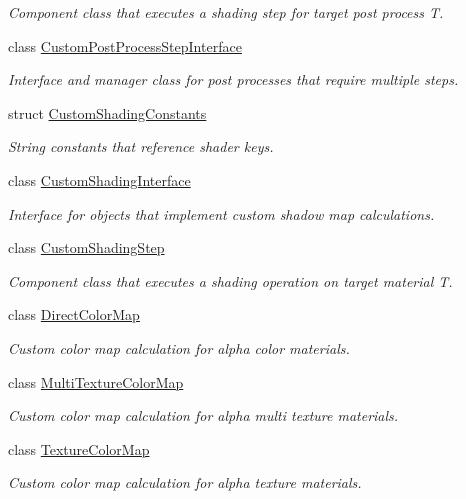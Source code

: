 \begin{DoxyCompactItemize}
\begin{DoxyCompactList}\small\item\em Component class that executes a shading step for target post process T. \end{DoxyCompactList}\item 
class \mbox{\hyperlink{class_geometry_engine_1_1_custom_shading_1_1_custom_post_process_step_interface}{Custom\+Post\+Process\+Step\+Interface}}
\begin{DoxyCompactList}\small\item\em Interface and manager class for post processes that require multiple steps. \end{DoxyCompactList}\item 
struct \mbox{\hyperlink{struct_geometry_engine_1_1_custom_shading_1_1_custom_shading_constants}{Custom\+Shading\+Constants}}
\begin{DoxyCompactList}\small\item\em String constants that reference shader keys. \end{DoxyCompactList}\item 
class \mbox{\hyperlink{class_geometry_engine_1_1_custom_shading_1_1_custom_shading_interface}{Custom\+Shading\+Interface}}
\begin{DoxyCompactList}\small\item\em Interface for objects that implement custom shadow map calculations. \end{DoxyCompactList}\item 
class \mbox{\hyperlink{class_geometry_engine_1_1_custom_shading_1_1_custom_shading_step}{Custom\+Shading\+Step}}
\begin{DoxyCompactList}\small\item\em Component class that executes a shading operation on target material T. \end{DoxyCompactList}\item 
class \mbox{\hyperlink{class_geometry_engine_1_1_custom_shading_1_1_direct_color_map}{Direct\+Color\+Map}}
\begin{DoxyCompactList}\small\item\em Custom color map calculation for alpha color materials. \end{DoxyCompactList}\item 
class \mbox{\hyperlink{class_geometry_engine_1_1_custom_shading_1_1_multi_texture_color_map}{Multi\+Texture\+Color\+Map}}
\begin{DoxyCompactList}\small\item\em Custom color map calculation for alpha multi texture materials. \end{DoxyCompactList}\item 
class \mbox{\hyperlink{class_geometry_engine_1_1_custom_shading_1_1_texture_color_map}{Texture\+Color\+Map}}
\begin{DoxyCompactList}\small\item\em Custom color map calculation for alpha texture materials. \end{DoxyCompactList}\end{DoxyCompactItemize}
